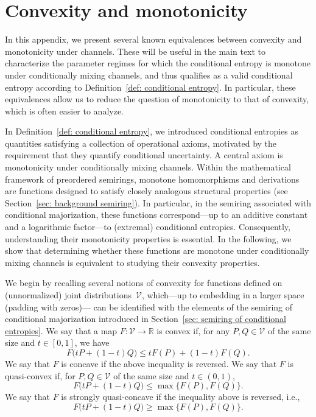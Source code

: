 \documentclass[aps,pra,11pt,onecolumn,nofootinbib,tightenlines]{revtex4-2}
\theoremstyle{definition}
\newcommand{\V}{\mathcal{V}}
\newcommand{\mb}[1]{\mathbb{#1}}
\begin{document}




\newpage
\appendix

\section{Convexity and monotonicity}
\label{app: convexity and monotonicity}
In this appendix, we present several known equivalences between convexity and monotonicity under channels. These will be useful in the main text to characterize the parameter regimes for which the conditional entropy is monotone under conditionally mixing channels, and thus qualifies as a valid conditional entropy according to Definition~\ref{def: conditional entropy}. In particular, these equivalences allow us to reduce the question of monotonicity to that of convexity, which is often easier to analyze. 

In Definition~\ref{def: conditional entropy}, we introduced conditional entropies as quantities satisfying a collection of operational axioms, motivated by the requirement that they quantify conditional uncertainty. A central axiom is monotonicity under conditionally mixing channels.
Within the mathematical framework of preordered semirings, monotone homomorphisms and derivations are functions designed to satisfy closely analogous structural properties (see Section~\ref{sec: background semiring}). In particular, in the semiring associated with conditional majorization, these functions correspond—up to an additive constant and a logarithmic factor—to (extremal) conditional entropies.
Consequently, understanding their monotonicity properties is essential. In the following, we show that determining whether these functions are monotone under conditionally mixing channels is equivalent to studying their convexity properties.


We begin by recalling several notions of convexity for functions defined on
(unnormalized) joint distributions~$\mathcal V$, which—up to embedding in a larger space (padding with zeros)—
can be identified with the elements of the semiring of conditional majorization
introduced in Section~\ref{sec: semiring of conditional entropies}.
 We say that a map $F:\V\to\mb R$ is convex if, for any $P,Q\in\V$ of the same size and $t\in[0,1]$, we have
\begin{equation}
F\big(tP+(1-t)Q\big)\leq tF(P)+(1-t)F(Q).
\end{equation}
We say that $F$ is concave if the above inequality is reversed. We say that $F$ is quasi-convex if, for $P,Q\in\V$ of the same size and $t\in(0,1)$,
\begin{equation}
F\big(tP+(1-t)Q\big)\leq\max\{F(P),F(Q)\}.
\end{equation}
We say that $F$ is strongly quasi-concave if the inequality above is reversed, i.e.,
\begin{equation}
\label{eq: def strongly quasi-conc}
    F\big(tP+(1-t)Q\big)\geq\max\{F(P),F(Q)\}.
\end{equation}
\end{document}
